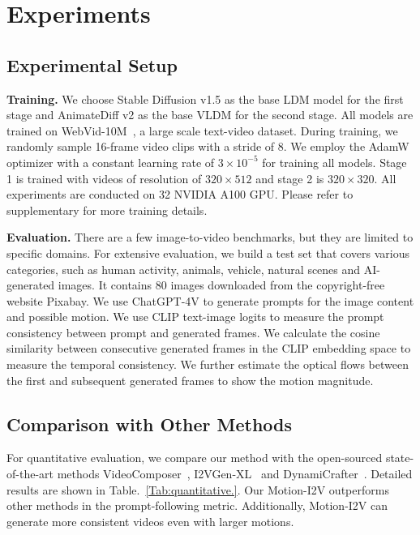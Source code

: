 \documentclass[10pt,twocolumn,letterpaper]{article}
\begin{document}
\section{Experiments}
\subsection{Experimental Setup}
\noindent \textbf{Training.} We choose Stable Diffusion v1.5 as the base LDM model for the first stage and AnimateDiff v2 as the base VLDM for the second stage. All models are trained on WebVid-10M~\cite{Bain21}, a large scale text-video dataset. During training, we randomly sample 16-frame video clips with a stride of 8. We employ the AdamW~\cite{loshchilov2017decoupled} optimizer with a constant learning rate of $3\times10^{-5}$ for training all models. Stage 1 is trained with videos of resolution of $320 \times 512$ and stage 2 is $320 \times 320$. All experiments are conducted on 32 NVIDIA A100 GPU. Please refer to supplementary for more training details.

\noindent \textbf{Evaluation.} There are a few image-to-video benchmarks, but they are limited to specific domains. For extensive evaluation, we build a test set that covers various categories, such as human activity, animals, vehicle, natural scenes and AI-generated images. It contains $80$ images downloaded from the copyright-free website Pixabay. We use ChatGPT-4V to generate prompts for the image content and possible motion. We use CLIP text-image logits to measure the prompt consistency between prompt and generated frames. We calculate the cosine similarity between consecutive generated frames in the CLIP embedding space to measure the temporal consistency. We further estimate the optical flows between the first and subsequent generated frames to show the motion magnitude.

\subsection{Comparison with Other Methods}

For quantitative evaluation, we compare our method with the open-sourced state-of-the-art methods VideoComposer~\cite{2023videocomposer}, I2VGen-XL~\cite{2023i2vgenxl} and DynamiCrafter~\cite{xing2023dynamicrafter}. Detailed results are shown in Table.~\ref{Tab:quantitative.}. Our Motion-I2V outperforms other methods in the prompt-following metric. Additionally, Motion-I2V can generate more consistent videos even with larger motions.
\end{document}
